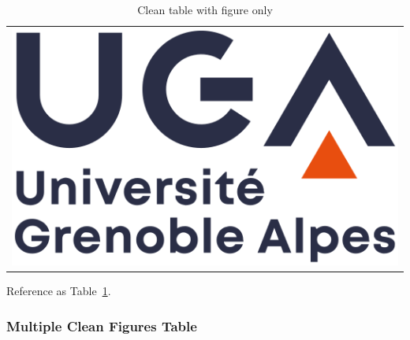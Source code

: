 \documentclass[
  letterpaper,
  oneside,
  openany]{MastersDoctoralThesis}
\theoremstyle{plain}
\theoremstyle{remark}
\begin{document}
\begin{longtable}[]{@{}
  >{\centering\arraybackslash}p{}@{}}
\caption{Clean table with figure
only}\label{tbl-clean-figure}\tabularnewline
\toprule\noalign{}
\endfirsthead
\endhead
\bottomrule\noalign{}
\endlastfoot
\includegraphics[width=0.8\linewidth,height=\textheight,keepaspectratio]{Chapters/images/logo.png} \\
\end{longtable}

Reference as Table~\ref{tbl-clean-figure}.

\subsubsection*{Multiple Clean Figures
Table}\label{multiple-clean-figures-table}
\end{document}
